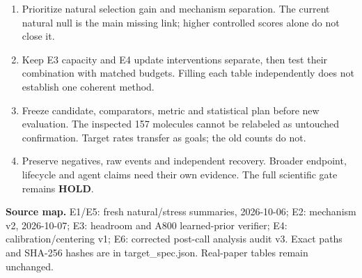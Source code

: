 \documentclass[10pt,letterpaper]{article}
\newcommand{\note}[1]{{\fontsize{8.5}{10.5}\selectfont #1\par}}
\newcommand{\sectionhead}[1]{\vspace{7pt}{\large\bfseries #1}\par\vspace{3pt}}
\begin{document}
\sectionhead{6. What would turn these goals into evidence?}
\begin{enumerate}\setlength{\itemsep}{2pt}
\item Prioritize natural selection gain and mechanism separation. The current natural null is the main missing link; higher controlled scores alone do not close it.
\item Keep E3 capacity and E4 update interventions separate, then test their combination with matched budgets. Filling each table independently does not establish one coherent method.
\item Freeze candidate, comparators, metric and statistical plan before new evaluation. The inspected 157 molecules cannot be relabeled as untouched confirmation. Target rates transfer as goals; the old counts do not.
\item Preserve negatives, raw events and independent recovery. Broader endpoint, lifecycle and agent claims need their own evidence. The full scientific gate remains \textbf{HOLD}.
\end{enumerate}
\note{\textbf{Source map.} E1/E5: fresh natural/stress summaries, 2026-10-06; E2: mechanism v2, 2026-10-07; E3: headroom and A800 learned-prior verifier; E4: calibration/centering v1; E6: corrected post-call analysis audit v3. Exact paths and SHA-256 hashes are in target\_spec.json. Real-paper tables remain unchanged.}
\end{document}
